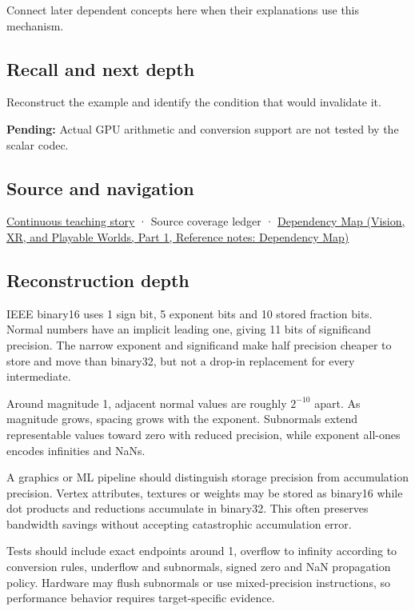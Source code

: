 Connect later dependent concepts here when their explanations use this mechanism.

\subsection{Recall and next depth}\label{appendix-34443cec7170-recall-and-next-depth}

\hypertarget{appendix-34443cec7170-recall-and-next-depth}{}

Reconstruct the example and identify the condition that would invalidate it.

\textbf{Pending:} Actual GPU arithmetic and conversion support are not tested by the scalar codec.

\subsection{Source and navigation}\label{appendix-34443cec7170-source-and-navigation}

\hypertarget{appendix-34443cec7170-source-and-navigation}{}

\hyperref[01-foundations-i-ch001-choosing-what-information-to-keep]{Continuous teaching story} · {Source coverage ledger} · \href{../07-Vision-XR-and-Playable-Worlds-P01/main.pdf\#nameddest=appendix-4ad47bdd269a}{Dependency Map (Vision, XR, and Playable Worlds, Part 1, Reference notes: Dependency Map)}

\subsection{Reconstruction depth}\label{appendix-34443cec7170-reconstruction-depth}

\hypertarget{appendix-34443cec7170-reconstruction-depth}{}

IEEE binary16 uses 1 sign bit, 5 exponent bits and 10 stored fraction bits. Normal numbers have an implicit leading one, giving 11 bits of significand precision. The narrow exponent and significand make half precision cheaper to store and move than binary32, but not a drop-in replacement for every intermediate.

Around magnitude 1, adjacent normal values are roughly \(2^{-10}\) apart. As magnitude grows, spacing grows with the exponent. Subnormals extend representable values toward zero with reduced precision, while exponent all-ones encodes infinities and NaNs.

A graphics or ML pipeline should distinguish storage precision from accumulation precision. Vertex attributes, textures or weights may be stored as binary16 while dot products and reductions accumulate in binary32. This often preserves bandwidth savings without accepting catastrophic accumulation error.

Tests should include exact endpoints around 1, overflow to infinity according to conversion rules, underflow and subnormals, signed zero and NaN propagation policy. Hardware may flush subnormals or use mixed-precision instructions, so performance behavior requires target-specific evidence.
